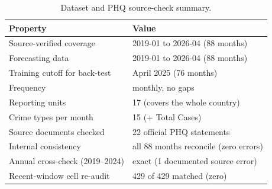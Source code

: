 \documentclass[conference]{IEEEtran}
\begin{document}
\begin{table}[t]
\caption{Dataset and PHQ source-check summary.}
\label{tab:data}
\centering
\renewcommand{\arraystretch}{1.2}
\begin{tabular}{@{}ll@{}}
\toprule
\textbf{Property} & \textbf{Value} \\
\midrule
Source-verified coverage & 2019-01 to 2026-04 (88 months) \\
Forecasting data & 2019-01 to 2026-04 (88 months) \\
Training cutoff for back-test & April 2025 (76 months) \\
Frequency & monthly, no gaps \\
Reporting units & 17 (covers the whole country) \\
Crime types per month & 15 (+ Total Cases) \\
Source documents checked & 22 official PHQ statements \\
Internal consistency & all 88 months reconcile (zero errors) \\
Annual cross-check (2019--2024) & exact (1 documented source error) \\
Recent-window cell re-audit & 429 of 429 matched (zero) \\
\bottomrule
\end{tabular}
\end{table}
\end{document}

